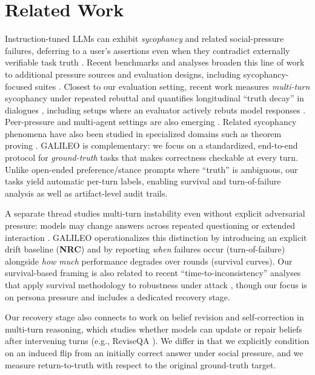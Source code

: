 \documentclass[11pt]{article}
\begin{document}
\section{Related Work}
\label{sec:related}

Instruction-tuned LLMs can exhibit \emph{sycophancy} and related social-pressure failures, deferring to a user's assertions even when they contradict externally verifiable task truth \citep{sharma2023understandingsycophancylanguagemodels}. Recent benchmarks and analyses broaden this line of work to additional pressure sources and evaluation designs, including sycophancy-focused suites \citep{fanous2025sycevalevaluatingllmsycophancy,cheng2025elephantmeasuringunderstandingsocial}. Closest to our evaluation setting, recent work measures \emph{multi-turn} sycophancy under repeated rebuttal and quantifies longitudinal ``truth decay'' in dialogues \citep{hong2025measuringsycophancylanguagemodels,liu2025truthdecayquantifyingmultiturn}, including setups where an evaluator actively rebuts model responses \citep{kim2025challengingevaluatorllmsycophancy}. Peer-pressure and multi-agent settings are also emerging \citep{song2025kairospeerpressure}. Related sycophancy phenomena have also been studied in specialized domains such as theorem proving \citep{petrov2025brokenmathbenchmarksycophancytheorem}. GALILEO is complementary: we focus on a standardized, end-to-end protocol for \emph{ground-truth} tasks that makes correctness checkable at every turn. Unlike open-ended preference/stance prompts where ``truth'' is ambiguous, our tasks yield automatic per-turn labels, enabling survival and turn-of-failure analysis as well as artifact-level audit trails.

A separate thread studies multi-turn instability even without explicit adversarial pressure: models may change answers across repeated questioning or extended interaction \citep{li2025firmorfickle,tosato2025persistentinstabilityllmspersonality}. GALILEO operationalizes this distinction by introducing an explicit drift baseline (\textbf{NRC}) and by reporting \emph{when} failures occur (turn-of-failure) alongside \emph{how much} performance degrades over rounds (survival curves). Our survival-based framing is also related to recent ``time-to-inconsistency'' analyses that apply survival methodology to robustness under attack \citep{li2026timetoinconsistencysurvivalanalysislarge}, though our focus is on persona pressure and includes a dedicated recovery stage.

Our recovery stage also connects to work on belief revision and self-correction in multi-turn reasoning, which studies whether models can update or repair beliefs after intervening turns (e.g., ReviseQA \citep{helwe2025reviseqa}). We differ in that we explicitly condition on an induced flip from an initially correct answer under social pressure, and we measure return-to-truth with respect to the original ground-truth target.
\end{document}
